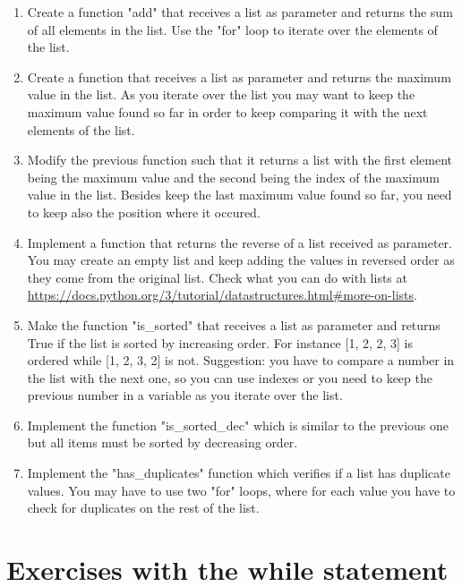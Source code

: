 \begin{enumerate}

\item Create a function "add" that receives a list as parameter and returns the sum of all elements in the list. Use the "for" loop to iterate over the elements of the list.

\item Create a function that receives a list as parameter and returns the maximum value in the list. As you iterate over the list you may want to keep the maximum value found so far in order to keep comparing it with the next elements of the list.

\item Modify the previous function such that it returns a list with the first element being the maximum value and the second being the index of the maximum value in the list. Besides keep the last maximum value found so far, you need to keep also the position where it occured. 

\item Implement a function that returns the reverse of a list received as parameter. You may create an empty list and keep adding the values in reversed order as they come from the original list. Check what you can do with lists at \url{https://docs.python.org/3/tutorial/datastructures.html#more-on-lists}.

\item Make the function "is\_sorted" that receives a list as parameter and returns True if the list is sorted by increasing order. For instance [1, 2, 2, 3] is ordered while [1, 2, 3, 2] is not. Suggestion: you have to compare a number in the list with the next one, so you can use indexes or you need to keep the previous number in a variable as you iterate over the list.

\item Implement the function "is\_sorted\_dec" which is similar to the previous one but all items must be sorted by decreasing order.

\item Implement the "has\_duplicates" function which verifies if a list has duplicate values. You may have to use two "for" loops, where for each value you have to check for duplicates on the rest of the list.

\end{enumerate}


\section{Exercises with the while statement}

